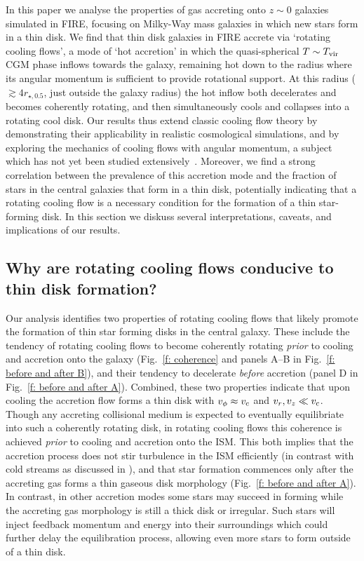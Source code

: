 \documentclass[fleqn,usenatbib]{mnras}
\newcommand{\Tvir}{T_{\rm vir}}
\begin{document}
In this paper we analyse the properties of gas accreting onto $z\sim0$ galaxies simulated in FIRE, focusing on Milky-Way mass galaxies in which new stars form in a thin disk. 
We find that thin disk galaxies in FIRE accrete via `rotating cooling flows', a mode of `hot accretion' in which the quasi-spherical $T\sim\Tvir$ CGM phase inflows towards the galaxy, remaining hot down to the radius where its angular momentum is sufficient to provide rotational support.
At this radius ($\gtrsim 4 r_{\star,0.5}$, just outside the galaxy radius) the hot inflow both decelerates and becomes coherently rotating, and then simultaneously cools and collapses into a rotating cool disk.
Our results thus extend classic cooling flow theory by demonstrating their applicability in realistic cosmological simulations, and by exploring the mechanics of cooling flows with angular momentum, a subject which has not yet been studied extensively~\citep[c.f.][]{Cowie1980, Stern2019}.
Moreover, we find a strong correlation between the prevalence of this accretion mode and the fraction of stars in the central galaxies that form in a thin disk, potentially indicating that a rotating cooling flow is a necessary condition for the formation of a thin star-forming disk.
In this section we diskuss several interpretations, caveats, and implications of our results. 

\subsection{Why are rotating cooling flows conducive to thin disk formation?}
\label{s: why CFs thin disks}

Our analysis identifies two properties of rotating cooling flows that likely promote the formation of thin star forming disks in the central galaxy.
These include the tendency of rotating cooling flows to become coherently rotating \textit{prior} to cooling and accretion onto the galaxy (Fig.~\ref{f: coherence} and panels A--B in Fig.~\ref{f: before and after B}),
and their tendency to decelerate \textit{before} accretion (panel D in Fig.~\ref{f: before and after A}).
Combined, these two properties indicate that upon cooling the accretion flow forms a thin disk with $v_\phi\approx v_{\rm c}$ and $v_r, v_z \ll v_{\rm c}$. 
Though any accreting collisional medium is expected to eventually equilibriate into such a coherently rotating disk, in rotating cooling flows this coherence is achieved \textit{prior} to cooling and accretion onto the ISM.
This both implies that the accretion process does not stir turbulence in the ISM efficiently (in contrast with cold streams as discussed in \citealt{Dekel2009}), and that star formation commences only after the accreting gas forms a thin gaseous disk morphology (Fig.~\ref{f: before and after A}).
In contrast, in other accretion modes some stars may succeed in forming while the accreting gas morphology is still a thick disk or irregular.
Such stars will inject feedback momentum and energy into their surroundings which could further delay the equilibration process, allowing even more stars to form outside of a thin disk. 
\end{document}
